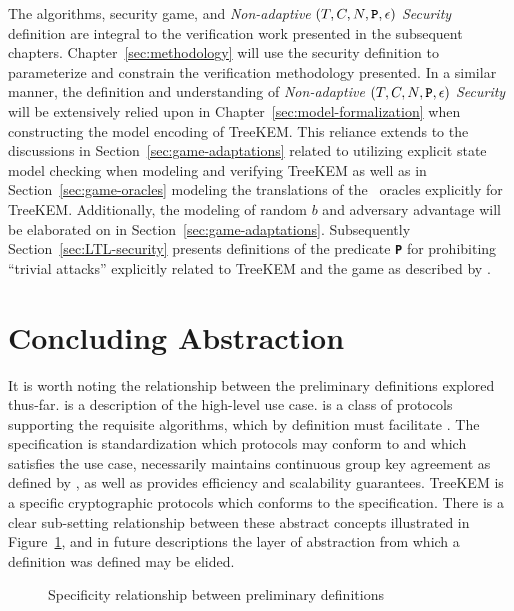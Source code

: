 The  algorithms, security game, and \emph{Non-adaptive} \((T, C, N, \textbf{\texttt{P}}, \epsilon)\) \emph{ Security} definition are integral to the verification work presented in the subsequent chapters.
Chapter\ \ref{sec:methodology} will use the security definition to parameterize and constrain the verification methodology presented.
In a similar manner, the definition and understanding of \emph{Non-adaptive} \((T, C, N, \textbf{\texttt{P}}, \epsilon)\) \emph{ Security} will be extensively relied upon in Chapter\ \ref{sec:model-formalization} when constructing the model encoding of TreeKEM.\@
This reliance extends to the discussions in Section\ \ref{sec:game-adaptations} related to utilizing explicit state model checking when modeling and verifying TreeKEM
as well as in Section\ \ref{sec:game-oracles} modeling the translations of the \CGKAsec\ oracles explicitly for TreeKEM.\@
Additionally, the modeling of random \(b\) and adversary advantage will be elaborated on in Section\ \ref{sec:game-adaptations}.
Subsequently Section\ \ref{sec:LTL-security} presents definitions of the predicate \textbf{\texttt{P}} for prohibiting ``trivial attacks'' explicitly related to TreeKEM and the  game as described by \autocite{alwen2020security}.


\hypertarget{sec:concluding-abstraction}{%
\section{Concluding Abstraction}\label{sec:concluding-abstraction}}

It is worth noting the relationship between the preliminary definitions explored thus-far.
 is a description of the high-level use case.
 is a class of protocols supporting the requisite algorithms, which by definition must facilitate .
The  specification is standardization which protocols may conform to and which satisfies the  use case, necessarily maintains continuous group key agreement as defined by , as well as provides efficiency and scalability guarantees.
TreeKEM is a specific cryptographic protocols which conforms to the  specification.
There is a clear sub-setting relationship between these abstract concepts illustrated in Figure\ \ref{fig:venn-protocols}, and in future descriptions the layer of abstraction from which a definition was defined may be elided.

\begin{figure}
\centering
\caption{\label{fig:venn-protocols}Specificity relationship between preliminary definitions}
\end{figure}

